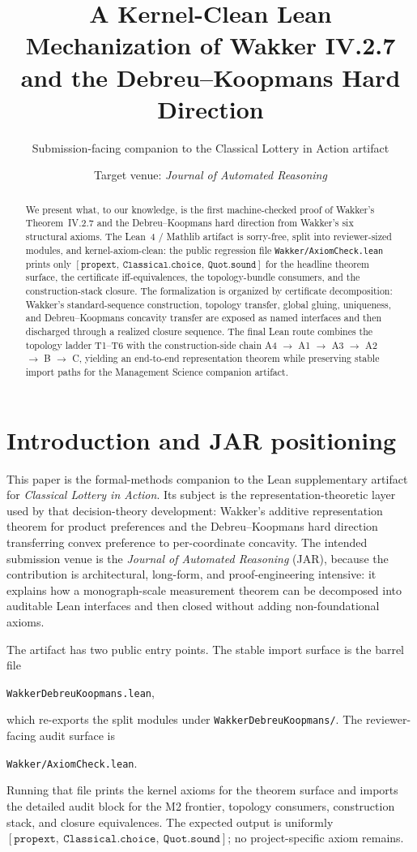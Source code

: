 \documentclass[11pt,english]{article}
\title{A Kernel-Clean Lean Mechanization of Wakker IV.2.7 and the Debreu--Koopmans Hard Direction}
\author{Submission-facing companion to the Classical Lottery in Action artifact}
\date{Target venue: \emph{Journal of Automated Reasoning}}
\begin{document}
\maketitle

\begin{abstract}
We present what, to our knowledge, is the first machine-checked proof of Wakker's Theorem~IV.2.7 and the Debreu--Koopmans hard direction from Wakker's six structural axioms.  The Lean~4 / Mathlib artifact is sorry-free, split into reviewer-sized modules, and kernel-axiom-clean: the public regression file \texttt{Wakker/AxiomCheck.lean} prints only \([\mathtt{propext},\ \mathtt{Classical.choice},\ \mathtt{Quot.sound}]\) for the headline theorem surface, the certificate iff-equivalences, the topology-bundle consumers, and the construction-stack closure.  The formalization is organized by certificate decomposition: Wakker's standard-sequence construction, topology transfer, global gluing, uniqueness, and Debreu--Koopmans concavity transfer are exposed as named interfaces and then discharged through a realized closure sequence.  The final Lean route combines the topology ladder T1--T6 with the construction-side chain A4 \(\to\) A1 \(\to\) A3 \(\to\) A2 \(\to\) B \(\to\) C, yielding an end-to-end representation theorem while preserving stable import paths for the Management Science companion artifact.
\end{abstract}

\section{Introduction and JAR positioning}
\label{sec:intro}

This paper is the formal-methods companion to the Lean supplementary artifact for \emph{Classical Lottery in Action}.  Its subject is the representation-theoretic layer used by that decision-theory development: Wakker's additive representation theorem for product preferences and the Debreu--Koopmans hard direction transferring convex preference to per-coordinate concavity.  The intended submission venue is the \emph{Journal of Automated Reasoning} (JAR), because the contribution is architectural, long-form, and proof-engineering intensive: it explains how a monograph-scale measurement theorem can be decomposed into auditable Lean interfaces and then closed without adding non-foundational axioms.

The artifact has two public entry points.  The stable import surface is the barrel file
\begin{center}
\texttt{WakkerDebreuKoopmans.lean},
\end{center}
which re-exports the split modules under \texttt{WakkerDebreuKoopmans/}.  The reviewer-facing audit surface is
\begin{center}
\texttt{Wakker/AxiomCheck.lean}.
\end{center}
Running that file prints the kernel axioms for the theorem surface and imports the detailed audit block for the M2 frontier, topology consumers, construction stack, and closure equivalences.  The expected output is uniformly \([\mathtt{propext},\ \mathtt{Classical.choice},\ \mathtt{Quot.sound}]\); no project-specific axiom remains.
\end{document}
